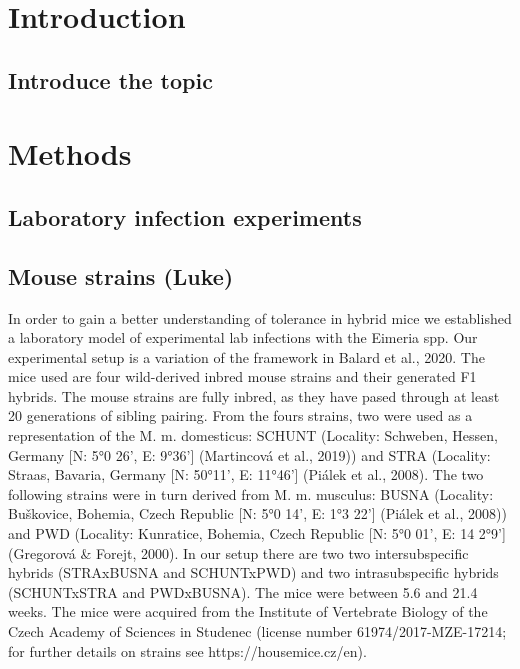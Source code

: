 \documentclass[webpdf,large,contemporary,namedate]{oup-authoring-template}
\theoremstyle{thmstyleone}
\theoremstyle{thmstyletwo}
\theoremstyle{thmstylethree}
\begin{document}


\maketitle


\hypertarget{introduction}{%
\section{Introduction}\label{introduction}}

\hypertarget{introduce-the-topic}{%
\subsection{Introduce the topic}\label{introduce-the-topic}}

\hypertarget{methods}{%
\section{Methods}\label{methods}}

\hypertarget{laboratory-infection-experiments}{%
\subsection{Laboratory infection
experiments}\label{laboratory-infection-experiments}}

\hypertarget{mouse-strains-luke}{%
\subsection{Mouse strains (Luke)}\label{mouse-strains-luke}}

In order to gain a better understanding of tolerance in hybrid mice we
established a laboratory model of experimental lab infections with the
Eimeria spp. Our experimental setup is a variation of the framework in
Balard et al., 2020. The mice used are four wild-derived inbred mouse
strains and their generated F1 hybrids. The mouse strains are fully
inbred, as they have pased through at least 20 generations of sibling
pairing. From the fours strains, two were used as a representation of
the M. m. domesticus: SCHUNT (Locality: Schweben, Hessen, Germany {[}N:
5°0 26', E: 9°36'{]} (Martincová et al., 2019)) and STRA (Locality:
Straas, Bavaria, Germany {[}N: 50°11', E: 11°46'{]} (Piálek et al.,
2008). The two following strains were in turn derived from M. m.
musculus: BUSNA (Locality: Buškovice, Bohemia, Czech Republic {[}N: 5°0
14', E: 1°3 22'{]} (Piálek et al., 2008)) and PWD (Locality: Kunratice,
Bohemia, Czech Republic {[}N: 5°0 01', E: 14 2°9'{]} (Gregorová \&
Forejt, 2000). In our setup there are two two intersubspecific hybrids
(STRAxBUSNA and SCHUNTxPWD) and two intrasubspecific hybrids
(SCHUNTxSTRA and PWDxBUSNA). The mice were between 5.6 and 21.4 weeks.
The mice were acquired from the Institute of Vertebrate Biology of the
Czech Academy of Sciences in Studenec (license number
61974/2017-MZE-17214; for further details on strains see
https://housemice.cz/en).
\end{document}
